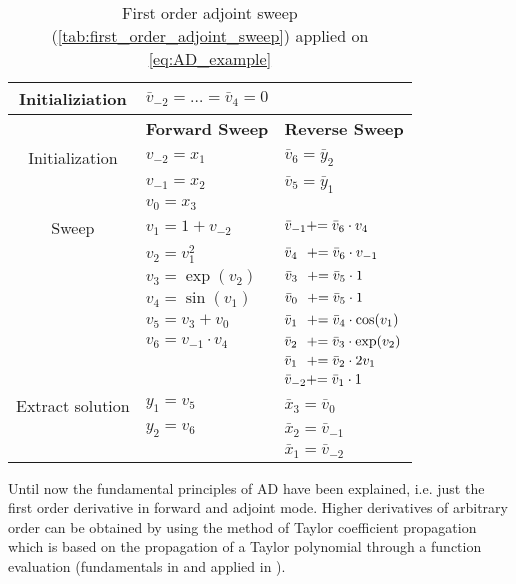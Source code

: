 \documentclass{scrartcl}[12pt, halfparskip]
\numberwithin{equation}{section}
\numberwithin{figure}{section}
\numberwithin{table}{section}
\begin{document}
\begin{table}[H]
	\centering
	\begin{tabular}{| c | l | l |} \hline
		Initializiation & $\bar{v}_{-2}=\dots=\bar{v}_4=0$ & \\ \hline
		& \textbf{Forward Sweep} & \textbf{Reverse Sweep} \\ \hline
		Initialization & $v_{-2}=x_1$ & $\bar{v}_6=\bar{y}_2$ \\
		& $v_{-1}=x_2$ & $\bar{v}_5=\bar{y}_1$ \\
		& $v_{0}=x_3$ &  \\	\hline
		Sweep & $v_1=1+v_{-2}$ & $\bar{v}_{-1} +\hspace{-0.1cm}= \bar{v}_6 \cdot v_4$ \\
		& $v_2=v_{1}^2$ & $\bar{v}_{4} \ \ +\hspace{-0.1cm}= \bar{v}_6 \cdot v_{-1} $ \\
		& $v_3=\exp(v_2)$ & $\bar{v}_{3} \ \ +\hspace{-0.1cm}= \bar{v}_5 \cdot 1 $ \\
		& $v_4= \sin(v_1)$ & $\bar{v}_{0} \ \ +\hspace{-0.1cm}= \bar{v}_5 \cdot 1 $ \\
		& $v_5=v_{3} + v_0$ & $\bar{v}_{1} \ \ +\hspace{-0.1cm}= \bar{v}_4 \cdot \cos(v_1) $ \\
		& $v_6=v_{-1} \cdot v_4$ & $\bar{v}_{2} \ \ +\hspace{-0.1cm}= \bar{v}_3 \cdot \exp(v_2) $ \\
		& & $\bar{v}_1 \ \ +\hspace{-0.1cm}= \bar{v}_2 \cdot 2 v_1$ \\
		& & $\bar{v}_{-2} +\hspace{-0.1cm}= \bar{v}_1 \cdot 1$	\\ \hline
		Extract solution & $y_1 = v_5$ & $\bar{x}_3 = \bar{v}_0$ \\
		& $y_2 = v_6$ & $\bar{x}_2 = \bar{v}_{-1}$ \\
		& & $\bar{x}_1 = \bar{v}_{-2}$	\\ \hline
	\end{tabular}
	\caption{First order adjoint sweep (\cref{tab:first_order_adjoint_sweep}) applied on \cref{eq:AD_example}}
	\label{tab:AD_example_adjoint}
\end{table} 


Until now the fundamental principles of AD have been explained, i.e. just the first order derivative in forward and adjoint mode. Higher derivatives of arbitrary order can be obtained by using the method of Taylor coefficient propagation which is based on the propagation of a Taylor polynomial through a function evaluation (fundamentals in \cite{TC-prop_basis} and applied in \cite{diss_jan}). \\
\end{document}
